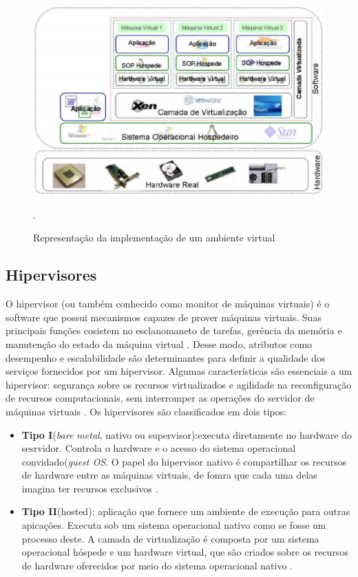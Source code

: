\begin{figure}[!htb]
\centering
\includegraphics [keepaspectratio=true,scale=0.60]{figuras/virtualization_arc.eps}
\caption{Representação da implementação de um ambiente virtual}
\cite{junior}.
\label{arc_virtualization}
\end{figure} 
 
\subsection{Hipervisores}
O hipervisor (ou também conhecido como monitor de máquinas virtuais) é o software que possui mecanismos capazes de prover máquinas virtuais. Suas principais funções cosistem no esclanomaneto de tarefas, gerência da memória e manutenção do estado da máquina virtual \cite{manoel}. Desse modo, atributos como desempenho e escalabilidade são determinantes para definir a qualidade dos serviços fornecidos por um hipervisor. Algumas características são essenciais a um hipervisor: segurança sobre os recursos virtualizados e agilidade na reconfiguração de recursos computacionais, sem interromper as operações do servidor de máquinas virtuais \cite{manoel}. Os hipervisores são classificados em dois tipos:

\begin{itemize}
\item \textbf{Tipo I}(\textit{bare metal}, nativo ou supervisor):executa diretamente no hardware do sesrvidor. Controla o hardware e o acesso do sistema operacional convidado(\textit{guest OS}. O papel do hipervisor nativo é compartilhar os recursos de hardware entre as máquinas virtuais, de fomra que cada uma delas imagina ter recursos exclusivos \cite{manoel}.

\item \textbf{Tipo II}(hosted): aplicação que fornece um ambiente de execução para outras apicações. Executa sob um sistema operacional nativo como se fosse um processo deste. A camada de virtualização é composta por um sistema operacional hóspede e um hardware virtual, que são criados sobre os recursos de hardware oferecidos por meio do sistema operacional nativo \cite{manoel}.
\end{itemize}


